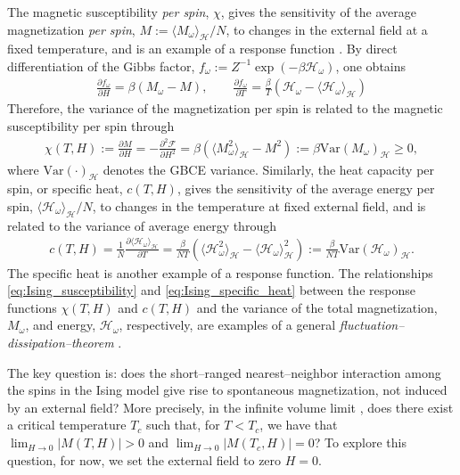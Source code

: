 \documentclass[english,12pt]{ttuthes}
\newcommand{\Hc}{\mathcal{H}}
\newcommand{\Fc}{\mathcal{F}}
\begin{document}
The magnetic susceptibility \emph{per spin}, $\chi$, gives the sensitivity of
the average magnetization \emph{per spin}, $M:=\langle M_\omega\rangle_{\Hc}/N$, to
changes in the external field at a fixed temperature, and is an example
of a response function \cite{Christensen-2005}. By direct
differentiation of the Gibbs factor,
$f_\omega:=Z^{-1}\exp(-\beta\Hc_\omega)$, one obtains 
\cite{Christensen-2005,Chandler-1987}  
%
\begin{align}
  \frac{\partial f_\omega}{\partial H}=\beta(M_\omega-M), \qquad
  \frac{\partial f_\omega}{\partial T}=\frac{\beta}{T}(\Hc_\omega-\langle\Hc_\omega\rangle_{\Hc})               
\end{align}
%
Therefore, the variance of the magnetization per spin is related to
the magnetic susceptibility per spin through
\cite{Christensen-2005,Chandler-1987} 
%
\begin{align}\label{eq:Ising_susceptibility}
  \chi(T,H):=\frac{\partial M}{\partial H}
        =-\frac{\partial^2\Fc}{\partial H^2}
        =\beta(\langle M_\omega^2\rangle_{\Hc}-M^2)
        :=\beta\text{Var}(M_\omega)_\Hc\geq0,
\end{align}
%
where $\text{Var}(\cdot)_\Hc$ denotes the GBCE variance. Similarly, the
heat capacity per spin, or specific heat, $c(T,H)$, gives 
the sensitivity of the average energy per spin, $\langle\Hc_\omega\rangle_{\Hc}/N$,
to changes in the temperature at fixed external field, and is related
to the variance of average energy through \cite{Christensen-2005}
%
\begin{align}\label{eq:Ising_specific_heat}
  c(T,H)=\frac{1}{N}\frac{\partial\langle\Hc_\omega\rangle_{\Hc}}{\partial T}
        =\frac{\beta}{NT}(\langle\Hc_\omega^2\rangle_{\Hc}-\langle\Hc_\omega\rangle^2_{\Hc})
        :=\frac{\beta}{NT}\text{Var}(\Hc_\omega)_\Hc.
\end{align}
%
The specific heat is another example of a response function. The
relationships \eqref{eq:Ising_susceptibility} and
\eqref{eq:Ising_specific_heat} between the response functions $\chi(T,H)$
and $c(T,H)$ and the variance of the total magnetization, $M_\omega$, and
energy, $\Hc_\omega$, respectively, are examples of
a general \emph{fluctuation--dissipation--theorem}
\cite{Chandler-1987}. 

The key question is: does the short--ranged nearest--neighbor
interaction among the spins in the Ising model give rise to
spontaneous magnetization, not induced by an external field? More
precisely, in the infinite volume limit \cite{Ruelle-1969,Firas}, does
there exist a critical temperature $T_c$ such that, for $T<T_c$, we
have that $\lim_{H\to0}|M(T,H)|>0$ and $\lim_{H\to0}|M(T_c,H)|=0$? To
explore this question, for now, we set the external field to zero
$H=0$.  
\end{document}

